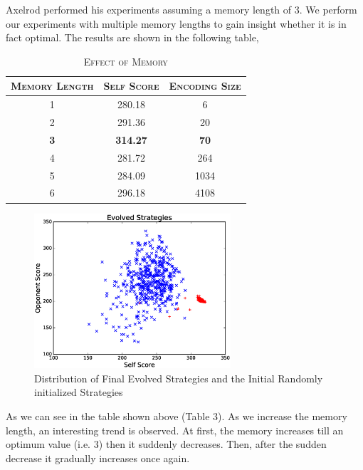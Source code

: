 \documentclass[a4paper]{article}
\begin{document}
	Axelrod performed his experiments assuming a memory length of 3. We perform our experiments with multiple memory lengths to gain insight whether it is in fact optimal. The results are shown in the following table,
	
	\begin{table}[H]
	  \begin{center}
	    \begin{tabular}{c|c|c}
	      \toprule
	      \textsc{Memory Length} & \textsc{Self Score} & \textsc{Encoding Size}\\
	      \midrule
	      1 & 280.18 & 6\\
		  2 & 291.36 & 20\\
		  \textbf{3} & \textbf{314.27} & \textbf{70}\\
		  4 & 281.72 & 264\\
		  5 & 284.09 & 1034\\
		  6 & 296.18 & 4108\\		  
		  \bottomrule
	    \end{tabular}
	    \caption{\textsc{Effect of Memory}}
	  \end{center}
	\end{table}  

	\begin{figure}[H]
	\centering
	\includegraphics[width=0.65\textwidth]{evolvePlot.eps}
	\caption{{Distribution of Final Evolved Strategies and the Initial Randomly initialized Strategies}}
	\end{figure}

	As we can see in the table shown above (Table 3). As we increase the memory length, an interesting trend is observed. At first, the memory increases till an optimum value (i.e. 3) then it suddenly decreases. Then, after the sudden decrease it gradually increases once again.\\
	
\end{document}
